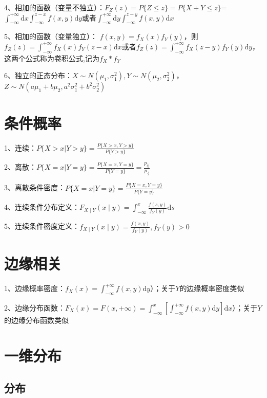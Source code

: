 4、相加的函数（变量不独立）：$F_{Z}(z)=P\{Z \leqslant z\}=P\{X+Y \leqslant z\}$=$\int_{-\infty}^{+\infty} \mathrm{d} x \int_{-\infty}^{z-x} f(x, y) \mathrm{d} y$或者$\int_{-\infty}^{+\infty} \mathrm{d} y \int_{-\infty}^{z-y} f(x, y) \mathrm{d} x$

5、相加的函数（变量独立）： $f(x, y)=f_{X}(x) f_{Y}(y)$，则$f_{Z}(z)=\int_{-\infty}^{+\infty} f_{X}(x) f_{Y}(z-x) \mathrm{d} x$或者$f_{Z}(z)=\int_{-\infty}^{+\infty} f_{X}(z-y) f_{Y}(y) \mathrm{d} y$，这两个公式称为卷积公式,记为$f_{X} * f_{Y}$

6、独立的正态分布：$X \sim{N}\left(\mu_{1}, \sigma_{1}^{2}\right), Y \sim N\left(\mu_{2}, \sigma_{2}^{2}\right)$，$Z \sim N\left(a\mu_{1}+b\mu_{2}, a^2\sigma_{1}^{2}+b^2\sigma_{2}^{2}\right)$

\section{条件概率}

1、连续：$P\{X>x|Y>y\} = \frac {P\{X>x,Y>y\}}{P\{Y>y\}}$

2、离散：$P\{X=x|Y=y\} = \frac {P\{X=x,Y=y\}}{P\{Y=y\}} = \frac {p_{ij}}{p_{\cdot j}}$

3、离散条件密度：$P\{X=x|Y=y\} = \frac {P\{X=x,Y=y\}}{P\{Y=y\}}$

4、连续条件分布定义：$F_{X \mid Y}(x \mid y)=\int_{-\infty}^{x} \frac{f(s, y)}{f_{Y}(y)} \mathrm{d} s$

5、连续条件密度定义：$f_{X \mid Y}(x \mid y)=\frac{f(x, y)}{f_{Y}(y)}, f_{Y}(y)>0$

\section{边缘相关}

1、边缘概率密度：$f_{X}(x)=\int_{-\infty}^{+\infty} f(x, y) \mathrm{d} y$）；关于$Y$的边缘概率密度类似

2、边缘分布函数：$F_{X}(x)=F(x,+\infty)=\int_{-\infty}^{x}\left[\int_{-\infty}^{+\infty} f(x, y) \mathrm{d} y\right] \mathrm{d} x$）；关于$Y$的边缘分布函数类似

\section{一维分布}



\subsection{分布}

